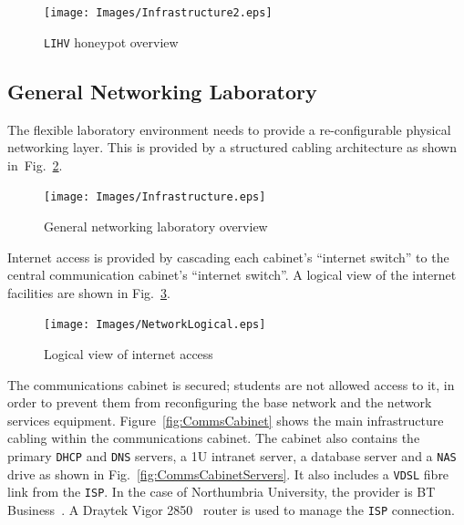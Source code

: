 \documentclass[10pt,journal]{IEEEtran}
\begin{document}
\begin{figure}[ht]
\begin{center}
	\texttt{[image: Images/Infrastructure2.eps]}
  \caption{\texttt{LIHV} honeypot overview}
\label{fig:Overview2}
\end{center}
\end{figure}

\subsection{General Networking Laboratory}

The flexible laboratory environment needs to provide a re-configurable physical
networking layer. This is provided by a structured cabling architecture as
shown in~Fig.~\ref{fig:Overview1}. 

\begin{figure}[ht]
  \begin{center}
    \texttt{[image: Images/Infrastructure.eps]}
  \caption{General networking laboratory overview}
  \label{fig:Overview1}
  \end{center}
  \end{figure}  

Internet access is provided by cascading each cabinet's ``internet switch'' to the central communication cabinet's ``internet switch''. A logical view of the internet facilities are shown in Fig.~\ref{fig:NetworkLogical}.

\begin{figure}[ht]
  \centering
  \begin{minipage}[ht]{0.45\textwidth}
    \texttt{[image: Images/NetworkLogical.eps]}
  \caption{Logical view of internet access}
  \label{fig:NetworkLogical}
  \end{minipage}
\end{figure}

The communications cabinet is secured; students are not allowed access to it,
in order to prevent them from reconfiguring the base network and the network
services equipment. Figure~\ref{fig:CommsCabinet} shows the main infrastructure cabling within the communications cabinet.  The cabinet also contains the primary \texttt{DHCP} and
\texttt{DNS} servers, a 1U intranet server, a database server and a
\texttt{NAS} drive as shown in Fig.~\ref{fig:CommsCabinetServers}. It also includes a \texttt{VDSL} fibre link from the \texttt{ISP}. In the case of Northumbria University, the provider is BT
Business~\cite{BT:17}. A Draytek Vigor 2850~\cite{DC:17} router is used to
manage the \texttt{ISP} connection. 
\end{document}
